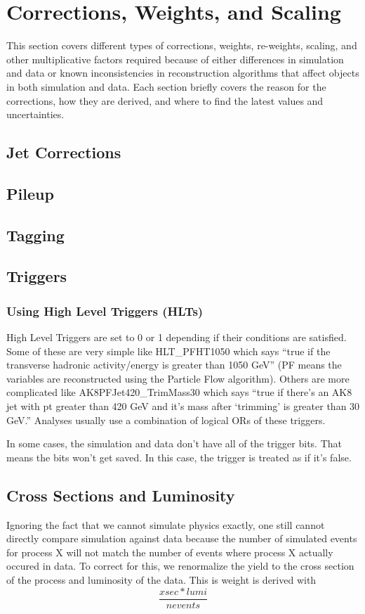 \section{Corrections, Weights, and Scaling}
This section covers different types of corrections, weights, re-weights, scaling, and other multiplicative factors required because of either differences in simulation and data or known inconsistencies in reconstruction algorithms that affect objects in both simulation and data. Each section briefly covers the reason for the corrections, how they are derived, and where to find the latest values and uncertainties.

\subsection{Jet Corrections}

\subsection{Pileup}

\subsection{Tagging}

\subsection{Triggers}
\subsubsection*{Using High Level Triggers (HLTs)}
High Level Triggers are set to 0 or 1 depending if their conditions are satisfied. Some of these are very simple like HLT\_PFHT1050 which says ``true if the transverse hadronic activity/energy is greater than 1050 GeV'' (PF means the variables are reconstructed using the Particle Flow algorithm). Others are more complicated like AK8PFJet420\_TrimMass30 which says ``true if there's an AK8 jet with pt greater than 420 GeV and it's mass after `trimming' is greater than 30 GeV.'' Analyses usually use a combination of logical ORs of these triggers.

In some cases, the simulation and data don't have all of the trigger bits. That means the bits won't get saved. In this case, the trigger is treated as if it's false. 

\subsection{Cross Sections and Luminosity}
Ignoring the fact that we cannot simulate physics exactly, one still cannot directly compare simulation against data because the number of simulated events for process X will not match the number of events where process X actually occured in data. To correct for this, we renormalize the yield to the cross section of the process and luminosity of the data. This is weight is derived with
\begin{equation}
    \frac{xsec*lumi}{nevents}
\end{equation}

